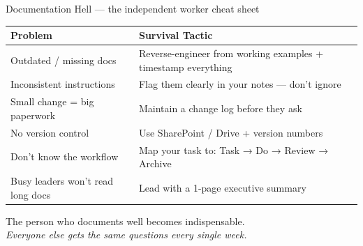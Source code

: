 \documentclass[aspectratio=169, 11pt]{beamer}
\begin{document}
	\begin{frame}{Documentation Hell — the independent worker cheat sheet}
		\begin{center}
			\small
			\begin{tabular}{p{4cm} p{7cm}}
				\toprule
				\textbf{Problem} & \textbf{Survival Tactic} \\
				\midrule
				Outdated / missing docs & Reverse-engineer from working examples + timestamp everything \\
				Inconsistent instructions & Flag them clearly in your notes — don't ignore \\
				Small change = big paperwork & Maintain a change log before they ask \\
				No version control & Use SharePoint / Drive + version numbers \\
				Don't know the workflow & Map your task to: Task → Do → Review → Archive \\
				Busy leaders won't read long docs & Lead with a 1-page executive summary \\
				\bottomrule
			\end{tabular}
		\end{center}
		\vspace{0.3cm}
		\alert{The person who documents well becomes indispensable.} \\
		\textit{Everyone else gets the same questions every single week.}
	\end{frame}
	
\end{document}
